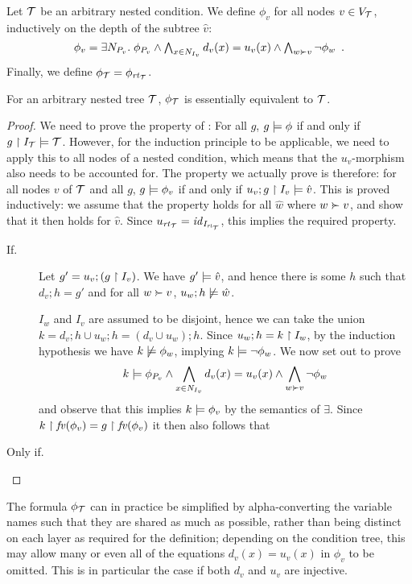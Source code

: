 Let ${\mathcal{T}}$ be an arbitrary nested condition. We define $\phi_v$ for all nodes $v\in V_{\mathcal{T}}$, inductively on the depth of the subtree $\hat v$:
%
\[ \phi_v = \textstyle \exists N_{P_v}\st \phi_{P_v}\wedge \bigwedge_{x\in N_{I_v}} d_v(x)=u_v(x) \wedge \bigwedge_{w\childof v} \neg\phi_w \enspace. \]
%
Finally, we define $\phi_{\mathcal{T}}=\phi_{\mathit{rt}_{{\mathcal{T}}}}$.
%
\begin{theorem}
For an arbitrary nested tree ${\mathcal{T}}$, $\phi_{\mathcal{T}}$ is essentially equivalent to ${\mathcal{T}}$.
\end{theorem}
%
\begin{proof}
We need to prove the property of : For all $g$, $g\models \phi$ if and only if $g\restriction I_{\mathcal{T}}\models {\mathcal{T}}$. However, for the induction principle to be applicable, we need to apply this to all nodes of a nested condition, which means that the $u_v$-morphism also needs to be accounted for. The property we actually prove is therefore: for all nodes $v$ of ${\mathcal{T}}$ and all $g$, $g\models \phi_v$ if and only if $u_v;g\restriction I_v\models \hat v$. This is proved inductively: we assume that the property holds for all $\hat w$ where $w\childof v$, and show that it then holds for $\hat v$. Since $u_{\mathit{rt}_{{\mathcal{T}}}}={\mathit{id}}_{I_{\mathit{rt}_{{\mathcal{T}}}}}$, this implies the required property.
%
\begin{description}
\item[If.] Let $g'=u_v;(g\restriction I_v)$. We have $g'\models \hat v$, and hence there is some $h$ such that $d_v;h=g'$ and for all $w\childof v$, $u_w;h\not\models \hat w$.

$I_w$ and $I_v$ are assumed to be disjoint, hence we can take the union $k=d_v;h\cup u_w;h=(d_v\cup u_w);h$. Since $u_w;h=k\restriction I_w$, by the induction hypothesis we have $k\not\models \phi_w$, implying $k\models \neg \phi_w$. We now set out to prove
%
\[ k\sat \phi_{P_v}\wedge \bigwedge_{x\in N_{I_v}} d_v(x)=u_v(x) \wedge \bigwedge_{w\childof v} \neg\phi_w \]
%
and observe that this implies $k\models \phi_v$ by the semantics of $\exists$. Since $k\restriction \mathit{fv}(\phi_v)=g\restriction \mathit{fv}(\phi_v)$ it then also follows that 
\item[Only if.] 
\end{description}
\end{proof}
%
The formula $\phi_{\mathcal{T}}$ can in practice be simplified by alpha-converting the variable names such that they are shared as much as possible, rather than being distinct on each layer as required for the definition; depending on the condition tree, this may allow many or even all of the equations $d_v(x)=u_v(x)$ in $\phi_v$ to be omitted. This is in particular the case if both $d_v$ and $u_v$ are injective.

